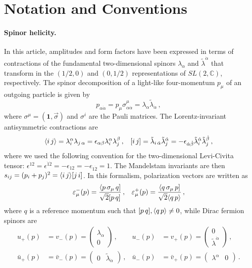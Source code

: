 \section{Notation and Conventions}
\label{app:notation}

\paragraph{Spinor helicity.}
In this article, amplitudes and form factors have been expressed in terms of contractions of the fundamental two-dimensional spinors $\lambda_{\alpha}$ and $\tilde\lambda^{\dot\alpha}$ that transform in the $(1/2,0)$ and $(0,1/2)$ representations of $SL(2,\mathbb{C})$, respectively.
The spinor decomposition of a light-like four-momentum $p_{\mu}$ of an outgoing particle is given by
\begin{equation}
    p_{\alpha \dot\alpha} = p_\mu \sigma^{\mu}_{\alpha \dot\alpha} = \lambda_\alpha \tilde \lambda_{\dot \alpha}\,,
\end{equation}
where $\sigma^\mu = (\mathbf{1},\vec \sigma)$ and $\sigma^i$ are the Pauli matrices.
The Lorentz-invariant antisymmetric contractions are
\begin{align}
    \langle i\, j \rangle = \lambda^\alpha_i \lambda_{j\,\alpha} = \epsilon_{\alpha\beta}\lambda_i^\alpha \lambda_j^\beta\,,
    &&
    \lbrack i\, j \rbrack = \tilde \lambda_{i\,\dot\alpha}\tilde\lambda_j^{\dot\alpha} = -\epsilon_{\dot\alpha \dot\beta}\tilde\lambda_{i}^{\dot\alpha} \tilde\lambda_j^{\dot\beta}\,,
\end{align}
where we used the following convention for the two-dimensional Levi-Civita tensor: $\epsilon^{12} = \epsilon^{\dot 1 \dot 2} = -\epsilon_{12} =-\epsilon_{\dot 1 \dot 2} = 1$.
The Mandelstam invariants are then $s_{ij} = (p_i+p_j)^2 = \langle i\, j \rangle\lbrack j\, i \rbrack$.
In this formalism, polarization vectors are written as
\begin{align}
    \varepsilon_\mu^-(p) = \frac{\langle p\,\sigma_\mu \, q]}{\sqrt{2}\lbrack p\, q \rbrack}\,, &&
    \varepsilon_\mu^+(p) = \frac{\langle q\,\sigma_\mu \, p]}{\sqrt{2}\langle q\, p \rangle}\,,
\end{align}
where $q$ is a reference momentum such that $\lbrack p\, q \rbrack, \langle q\, p \rangle\neq 0$, while Dirac fermion spinors are
\begin{align}
    u_+(p) &= v_-(p) = 
    \begin{pmatrix}
        \lambda_\alpha \\ 0
    \end{pmatrix}
    \,,
    &
    u_-(p) &= v_+(p) = 
    \begin{pmatrix}
        0 \\ \tilde\lambda^{\dot\alpha}
    \end{pmatrix}
    \,, 
    \\
    \bar u_+(p) &= \bar v_-(p) = 
    \begin{pmatrix}
        0 & \tilde\lambda_{\dot\alpha}
    \end{pmatrix}
    \,,
    &
    \bar u_-(p) &= \bar v_+(p) = 
    \begin{pmatrix}
        \lambda^\alpha & 0
    \end{pmatrix}
    \,.
\end{align}
